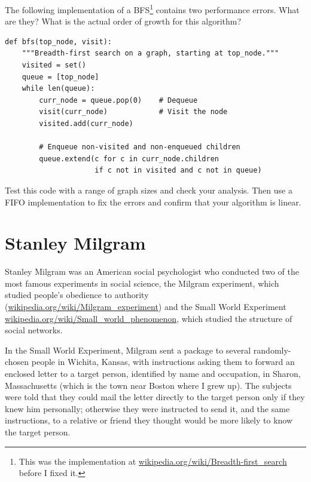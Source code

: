 \documentclass[10pt]{book}
\begin{document}
\begin{ex}

The following implementation of a BFS\footnote{This was the
  implementation at \url{wikipedia.org/wiki/Breadth-first_search}
  before I fixed it.}  contains two performance errors.  What are
they?  What is the actual order of growth for this algorithm?

\begin{verbatim}
def bfs(top_node, visit):
    """Breadth-first search on a graph, starting at top_node."""
    visited = set()
    queue = [top_node]
    while len(queue):
        curr_node = queue.pop(0)    # Dequeue
        visit(curr_node)            # Visit the node
        visited.add(curr_node)

        # Enqueue non-visited and non-enqueued children
        queue.extend(c for c in curr_node.children
                     if c not in visited and c not in queue)
\end{verbatim}

Test this code with a range of graph sizes and check your analysis.
Then use a FIFO implementation to fix the errors and confirm
that your algorithm is linear.

\end{ex}


\section{Stanley Milgram}

Stanley Milgram was an American social psychologist who conducted
two of the most famous experiments in social science, the
Milgram experiment, which studied people's obedience to authority
(\url{wikipedia.org/wiki/Milgram_experiment})
and the Small World Experiment
\url{wikipedia.org/wiki/Small_world_phenomenon}, which studied
the structure of social networks.

In the Small World Experiment, Milgram sent a package to several
randomly-chosen people in Wichita, Kansas, with instructions asking
them to forward an enclosed letter to a target person, identified by
name and occupation, in Sharon, Massachusetts (which is the town near
Boston where I grew up).  The subjects were told that they could mail
the letter directly to the target person only if they knew him
personally; otherwise they were instructed to send it, and the same
instructions, to a relative or friend they thought would be more
likely to know the target person.
\end{document}
